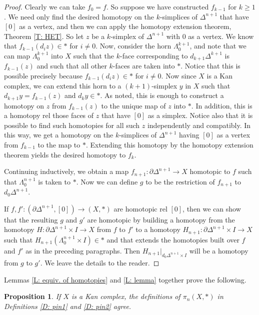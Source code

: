 \documentclass[12pt]{article}
\theoremstyle{plain}
\newtheorem{proposition}[theorem]{Proposition}
\theoremstyle{definition}
\theoremstyle{remark}
\newcommand{\bd}{\partial}
\begin{document}
\begin{proof}
Clearly we can take $f_0=f$. So suppose we have constructed $f_{k-1}$ for $k\geq 1$. We need only find the desired homotopy on the $k$-simplices of $\Delta^{n+1}$ that have $[0]$ as a vertex, and then we can apply the homotopy extension theorem, Theorem \ref{T: HET}. So let $z$ be a $k$-simplex of $\Delta^{n+1}$ with $0$ as a vertex. We know that $f_{k-1}(d_iz)\in *$ for $i\neq 0$. Now, consider the horn $\Lambda^{k+1}_0$, and note that we can map $\Lambda^{k+1}_0$ into $X$ such that the $k$-face corresponding to $d_{k+1}\Delta^{k+1}$ is $f_{k-1}(z)$ and such that all other $k$-faces are taken into $*$. Notice that this is possible precisely because $f_{k-1}(d_iz)\in *$ for $i\neq 0$. Now since $X$ is a Kan complex, we can extend this horn to a $(k+1)$-simplex $y$ in $X$ such that $d_{k+1}y=f_{k-1}(z)$ and $d_ky\in *$.  As noted, this is enough to construct a homotopy on $z$ from $f_{k-1}(z)$ to the unique map of $z$ into $*$. In addition, this is a homotopy rel those faces of $z$ that have $[0]$ as a simplex.
Notice also that it is possible to find such homotopies for all such $z$ independently and compatibly. In this way, we get a homotopy on the $k$-simplices of $\Delta^{n+1}$ having $[0]$ as a vertex from $f_{k-1}$ to the map to $*$.  Extending this homotopy by the homotopy extension theorem yields the desired homotopy to $f_k$. 

Continuing inductively, we obtain a map $f_{n+1}\colon \bd \Delta^{n+1}\to X$ homotopic to $f$ such that $\Lambda^{n+1}_0$ is taken to $*$. Now we can define $g$ to be the restriction of $f_{n+1}$ to $d_0\Delta^{n+1}$.  


If $f,f'\colon (\bd \Delta^{n+1},[0])\to (X,*)$ are homotopic rel $[0]$, then we can show that the resulting $g$ and $g'$ are homotopic  by building a homotopy from the homotopy $H\colon \bd \Delta^{n+1}\times I\to X$ from $f$ to $f'$ to a homotopy $H_{n+1}\colon \bd \Delta^{n+1}\times I\to X$ such that  $H_{n+1}(\Lambda^{n+1}_0\times I)\in *$ and that extends the homotopies built over $f$ and $f'$ as in the preceding paragraphs. Then $H_{n+1}|_{d_0\Delta^{n+1}\times I}$ will be a homotopy from $g$ to $g'$. We leave the details to the reader. 
\end{proof}

Lemmas \ref{L: equiv. of homotopies} and \ref{L: lemma} together prove the following.

\begin{proposition}
If $X$ is a Kan complex, the definitions of $\pi_n(X,*)$ in Definitions \ref{D: pin1} and \ref{D: pin2} agree.
\end{proposition}
\end{document}

